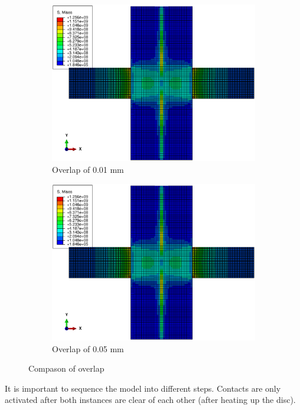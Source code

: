 \documentclass[12pt]{article}
\begin{document}
\begin{figure}[!htb]
  \centering
  \begin{subfigure}{.5\textwidth}
    \centering
    \includegraphics[width=0.95\linewidth]{pics/stress10}
    \caption{Overlap of 0.01 mm}
  \end{subfigure}%
  \begin{subfigure}{.5\textwidth}
    \centering
    \includegraphics[width=0.95\linewidth]{pics/stress50}
    \caption{Overlap of 0.05 mm}
   \end{subfigure}
  \caption{Compason of overlap}
\end{figure}

It is important to sequence the model into different steps. 
Contacts are only activated after both
instances are clear of each other (after heating up the disc).
\end{document}
